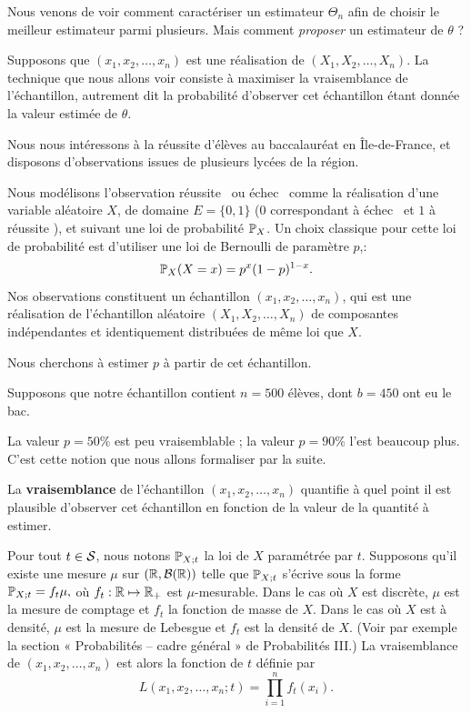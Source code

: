 Nous venons de voir comment caractériser un estimateur $\Theta_n$ afin de
choisir le meilleur estimateur parmi plusieurs. Mais comment \textit{proposer} un
estimateur de $\theta$ ?

Supposons que $(x_1, x_2, \dots, x_n)$ est une réalisation de
$(X_1, X_2, \dots, X_n)$. La technique que nous allons voir consiste à
maximiser la vraisemblance de l'échantillon, autrement dit la probabilité
d'observer cet échantillon étant donnée la valeur estimée de $\theta$.

\begin{exemple}
  Nous nous intéressons à la réussite d'élèves au baccalauréat en
  \^Ile-de-France, et disposons d'observations issues de plusieurs lycées de la
  région.

  Nous modélisons l'observation \og réussite \fg~ou \og échec \fg~comme la
  réalisation d'une variable aléatoire $X$, de domaine $E = \{0, 1\}$ ($0$
  correspondant à \og échec \fg~et $1$ à \og réussite \fg), et suivant une loi
  de probabilité $\mathbb{P}_X$.  Un choix classique pour cette loi de probabilité est
  d'utiliser une loi de Bernoulli de paramètre $p$,:
  \[
    \mathbb{P}_X(X=x) = p^x (1-p)^{1-x}.
  \] 
  Nos observations constituent un échantillon
  $(x_1, x_2, \dots, x_n)$, qui est une réalisation de l'échantillon aléatoire
  $(X_1, X_2, \dots, X_n)$ de composantes indépendantes et identiquement
  distribuées de même loi que $X$.

  Nous cherchons à estimer $p$ à partir de cet échantillon. 

  Supposons que notre échantillon contient $n=500$ élèves, dont $b=450$ ont
  eu le bac.

  La valeur $p=50\%$ est peu vraisemblable ; la valeur $p=90\%$ l'est beaucoup
  plus. C'est cette notion que nous allons formaliser par la suite.
\end{exemple}

La \textbf{vraisemblance} de l'échantillon $(x_1, x_2, \dots, x_n)$ quantifie à
quel point il est plausible d'observer cet échantillon en fonction de la valeur
de la quantité à estimer.

Pour tout $t \in \mathcal{S}$, nous notons $\mathbb{P}_{X; t}$ la loi de $X$ paramétrée par
$t.$ Supposons qu'il existe une mesure $\mu$ sur $(\mathbb{R}, \mathcal{B}(\mathbb{R}))$ telle que
$\mathbb{P}_{X; t}$ s'écrive sous la forme $\mathbb{P}_{X; t}= f_t \mu,$ où
$f_t: \mathbb{R} \mapsto \mathbb{R}_+$ est $\mu$-mesurable. Dans le cas où $X$ est discrète,
$\mu$ est la mesure de comptage et $f_t$ la fonction de masse de $X$. Dans le
cas où $X$ est à densité, $\mu$ est la mesure de Lebesgue et $f_t$ est la
densité de $X$. (Voir par exemple la section « Probabilités -- cadre général »
de Probabilités III.) La vraisemblance de $(x_1, x_2, \dots, x_n)$ est alors la
fonction de $t$ définie par
\begin{equation}
  L(x_1, x_2, \dots, x_n; t) = \prod_{i=1}^n f_t(x_i).
  \label{eq:likelihood}
\end{equation}

